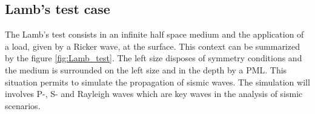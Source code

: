 \subsection{Lamb's test case}
The Lamb's test consists in an infinite half space medium and the application of a load, given by a Ricker wave, at the surface. This context can be summarized by the figure \ref{fig:Lamb_test}. The left size disposes of symmetry conditions and the medium is surrounded on the left size and in the depth by a PML. This situation permits to simulate the propagation of sismic waves. The simulation will involves P-, S- and Rayleigh waves which are key waves in the analysis of sismic scenarios.      